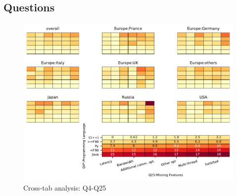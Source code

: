 
\subsection{Questions}


\begin{figure}
\begin{center}
\includegraphics[width=12cm]{../pdfs/Q4-Q25.pdf}
\caption{Cross-tab analysis: Q4-Q25}
\label{fig:Q4-Q25}
\end{center}
\end{figure}
